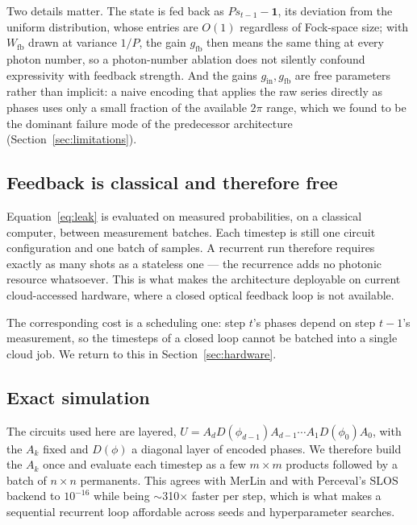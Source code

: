 \documentclass[11pt]{article}
\begin{document}
Two details matter. The state is fed back as $Ps_{t-1}-\mathbf{1}$, its deviation from the
uniform distribution, whose entries are $O(1)$ regardless of Fock-space size; with
$W_{\text{fb}}$ drawn at variance $1/P$, the gain $g_{\text{fb}}$ then means the same thing at
every photon number, so a photon-number ablation does not silently confound expressivity with
feedback strength. And the gains $g_{\text{in}}, g_{\text{fb}}$ are free parameters rather than
implicit: a naive encoding that applies the raw series directly as phases uses only a small
fraction of the available $2\pi$ range, which we found to be the dominant failure mode of the
predecessor architecture (Section~\ref{sec:limitations}).

\subsection{Feedback is classical and therefore free}\label{sec:free-feedback}

Equation~\eqref{eq:leak} is evaluated on measured probabilities, on a classical computer,
between measurement batches. Each timestep is still one circuit configuration and one batch of
samples. A recurrent run therefore requires exactly as many shots as a stateless one --- the
recurrence adds no photonic resource whatsoever. This is what makes the architecture
deployable on current cloud-accessed hardware, where a closed optical feedback loop is not
available.

The corresponding cost is a scheduling one: step $t$'s phases depend on step $t-1$'s
measurement, so the timesteps of a closed loop cannot be batched into a single cloud job. We
return to this in Section~\ref{sec:hardware}.

\subsection{Exact simulation}\label{sec:core}

The circuits used here are layered,
$U = A_d D(\phi_{d-1}) A_{d-1} \cdots A_1 D(\phi_0) A_0$, with the $A_k$ fixed and $D(\phi)$ a
diagonal layer of encoded phases. We therefore build the $A_k$ once and evaluate each timestep
as a few $m \times m$ products followed by a batch of $n \times n$ permanents. This agrees with
MerLin and with Perceval's SLOS backend to $10^{-16}$ while being $\sim$310$\times$ faster per
step, which is what makes a sequential recurrent loop affordable across seeds and
hyperparameter searches.
\end{document}
